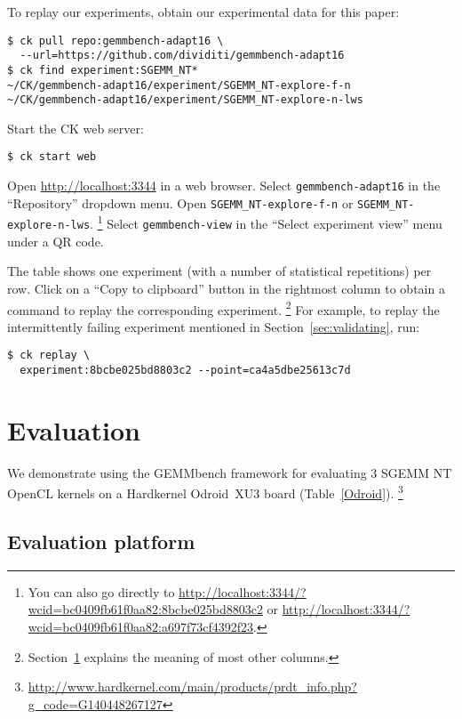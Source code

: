 \documentclass{acm_proc_article-sp} %
\begin{document}
To replay our experiments, obtain our experimental data for this paper:

\begin{verbatim}
$ ck pull repo:gemmbench-adapt16 \
  --url=https://github.com/dividiti/gemmbench-adapt16
$ ck find experiment:SGEMM_NT*
~/CK/gemmbench-adapt16/experiment/SGEMM_NT-explore-f-n
~/CK/gemmbench-adapt16/experiment/SGEMM_NT-explore-n-lws
\end{verbatim}

Start the CK web server:
\begin{verbatim}
$ ck start web
\end{verbatim}

Open \url{http://localhost:3344} in a web browser.
%
Select {\tt gemmbench-adapt16} in the ``Repository'' dropdown menu.
%
Open {\tt SGEMM\_NT-explore-f-n} or {\tt SGEMM\_NT-explore-n-lws}.%
%
\footnote{You can also go directly to
\url{http://localhost:3344/?wcid=bc0409fb61f0aa82:8bcbe025bd8803c2} or
\url{http://localhost:3344/?wcid=bc0409fb61f0aa82:a697f73cf4392f23}.}
%
Select {\tt gemmbench-view} in the ``Select experiment view'' menu under a QR
code.
%

The table shows one experiment (with a number of statistical repetitions) per
row.
%
Click on a ``Copy to clipboard'' button in the rightmost column to obtain a
command to replay the corresponding experiment.%
\footnote{Section~\ref{sec:evaluation} explains the meaning of most other
columns.}
%
For example, to replay the intermittently failing experiment mentioned in
Section~\ref{sec:validating}, run:
%
\begin{verbatim}
$ ck replay \
  experiment:8bcbe025bd8803c2 --point=ca4a5dbe25613c7d
\end{verbatim}
%

\section{Evaluation}
\label{sec:evaluation}

We demonstrate using the GEMMbench framework for evaluating 3 SGEMM NT
OpenCL kernels on a Hardkernel Odroid~XU3 board (Table~\ref{Odroid}).%
\footnote{\url{http://www.hardkernel.com/main/products/prdt_info.php?g_code=G140448267127}}

\subsection{Evaluation platform}
\end{document}

